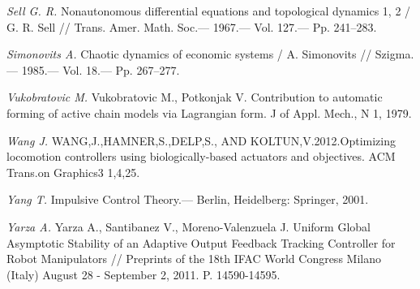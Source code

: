 \begin{thebibliography}{10}
	{\it Sell G. R.} Nonautonomous differential equations and topological dynamics 1, 2 /
	G. R. Sell // Trans. Amer. Math. Soc.— 1967.— Vol. 127.— Pp. 241–283.
	
	{\it Simonovits A.} Chaotic dynamics of economic systems /
	A. Simonovits // Szigma.— 1985.— Vol. 18.— Pp. 267–277.
	
	{\it Vukobratovic M.} Vukobratovic M., Potkonjak V. Contribution to automatic forming of active chain models via Lagrangian form. J of Appl. Mech., N 1, 1979.
	
	{\it Wang J.} WANG,J.,HAMNER,S.,DELP,S., AND KOLTUN,V.2012.Optimizing locomotion controllers using biologically-based actuators and objectives. ACM Trans.on Graphics3 1,4,25.
	
	{\it Yang T.} Impulsive Control Theory.— Berlin, Heidelberg: Springer, 2001.
	
	{\it Yarza A.} Yarza A., Santibanez V., Moreno-Valenzuela J. Uniform Global Asymptotic Stability of an Adaptive Output Feedback Tracking Controller for Robot Manipulators // Preprints of the 18th IFAC World Congress Milano (Italy) August 28 - September 2, 2011. P. 14590-14595. 
	
	
\end{thebibliography} 